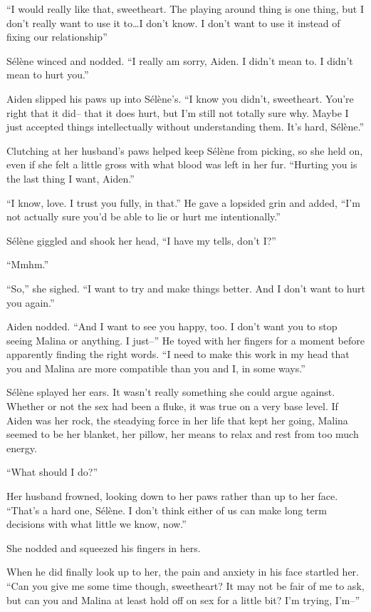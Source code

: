 ``I would really like that, sweetheart. The playing around thing is one thing, but I don't really want to use it to\ldots{}I don't know. I don't want to use it instead of fixing our relationship''

Sélène winced and nodded. ``I really am sorry, Aiden. I didn't mean to. I didn't mean to hurt you.''

Aiden slipped his paws up into Sélène's. ``I know you didn't, sweetheart. You're right that it did-- that it does hurt, but I'm still not totally sure why. Maybe I just accepted things intellectually without understanding them. It's hard, Sélène.''

Clutching at her husband's paws helped keep Sélène from picking, so she held on, even if she felt a little gross with what blood was left in her fur. ``Hurting you is the last thing I want, Aiden.''

``I know, love. I trust you fully, in that.'' He gave a lopsided grin and added, ``I'm not actually sure you'd be able to lie or hurt me intentionally.''

Sélène giggled and shook her head, ``I have my tells, don't I?''

``Mmhm.''

``So,'' she sighed. ``I want to try and make things better. And I don't want to hurt you again.''

Aiden nodded. ``And I want to see you happy, too. I don't want you to stop seeing Malina or anything. I just--'' He toyed with her fingers for a moment before apparently finding the right words. ``I need to make this work in my head that you and Malina are more compatible than you and I, in some ways.''

Sélène splayed her ears. It wasn't really something she could argue against. Whether or not the sex had been a fluke, it was true on a very base level. If Aiden was her rock, the steadying force in her life that kept her going, Malina seemed to be her blanket, her pillow, her means to relax and rest from too much energy.

``What should I do?''

Her husband frowned, looking down to her paws rather than up to her face. ``That's a hard one, Sélène. I don't think either of us can make long term decisions with what little we know, now.''

She nodded and squeezed his fingers in hers.

When he did finally look up to her, the pain and anxiety in his face startled her. ``Can you give me some time though, sweetheart? It may not be fair of me to ask, but can you and Malina at least hold off on sex for a little bit? I'm trying, I'm--''

